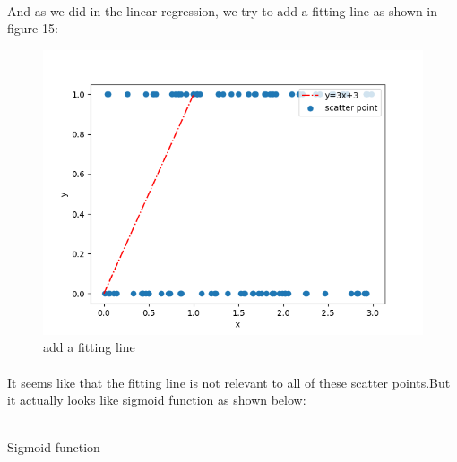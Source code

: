 \documentclass[a4paper,12pt]{article}
\begin{document}
\begin{spacing}{2}
\paragraph{ }And as we did in the linear regression, we try to add a fitting line as shown in figure 15:
\begin{figure}
\centering
\includegraphics[scale=0.5]{Figure_15.png}
\caption{add a fitting line}
\label{add a fitting line}
\end{figure}
\paragraph{ }It seems like that the fitting line is not relevant to all of these scatter points.But it actually looks like sigmoid function as shown below:
\begin{center}
\\
Sigmoid function
\end{center}

\end{spacing}
\end{document}
